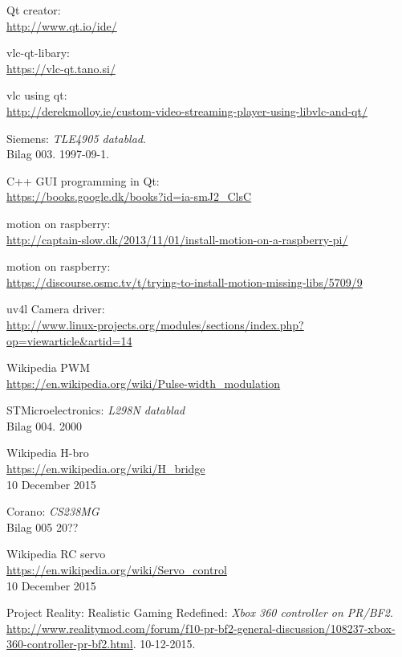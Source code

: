 \begin{thebibliography}{2}
 Qt creator: \\
\url{http://www.qt.io/ide/}

 vlc-qt-libary: \\
\url{https://vlc-qt.tano.si/}

 vlc using qt: \\
\url{http://derekmolloy.ie/custom-video-streaming-player-using-libvlc-and-qt/}

 Siemens: \textit{TLE4905 datablad}. \\
Bilag 003. 1997-09-1.

 C++ GUI programming in Qt: \\
\url{https://books.google.dk/books?id=ia-smJ2_ClsC}

 motion on raspberry: \\
\url{http://captain-slow.dk/2013/11/01/install-motion-on-a-raspberry-pi/}

 motion on raspberry: \\
\url{https://discourse.osmc.tv/t/trying-to-install-motion-missing-libs/5709/9}

 uv4l Camera driver: \\
\url{http://www.linux-projects.org/modules/sections/index.php?op=viewarticle&artid=14}

 Wikipedia PWM \\
\url{https://en.wikipedia.org/wiki/Pulse-width_modulation}

 STMicroelectronics: \textit{L298N datablad} \\
Bilag 004. 2000

 Wikipedia H-bro \\
\url{https://en.wikipedia.org/wiki/H_bridge}\\
10 December 2015

 Corano: \textit{CS238MG}\\
Bilag 005 20??

 Wikipedia RC servo \\
\url{https://en.wikipedia.org/wiki/Servo_control}\\
10 December 2015

 Project Reality: Realistic Gaming Redefined: \textit{Xbox 360 controller on PR/BF2}. \\
\url{http://www.realitymod.com/forum/f10-pr-bf2-general-discussion/108237-xbox-360-controller-pr-bf2.html}. 10-12-2015.


\end{thebibliography}
